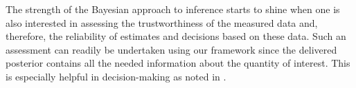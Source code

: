 The strength of the Bayesian approach to inference starts to shine when one is
also interested in assessing the trustworthiness of the measured data and,
therefore, the reliability of estimates and decisions based on these data. Such
an assessment can readily be undertaken using our framework since the delivered
posterior contains all the needed information about the quantity of interest.
This is especially helpful in decision-making as noted in
.
